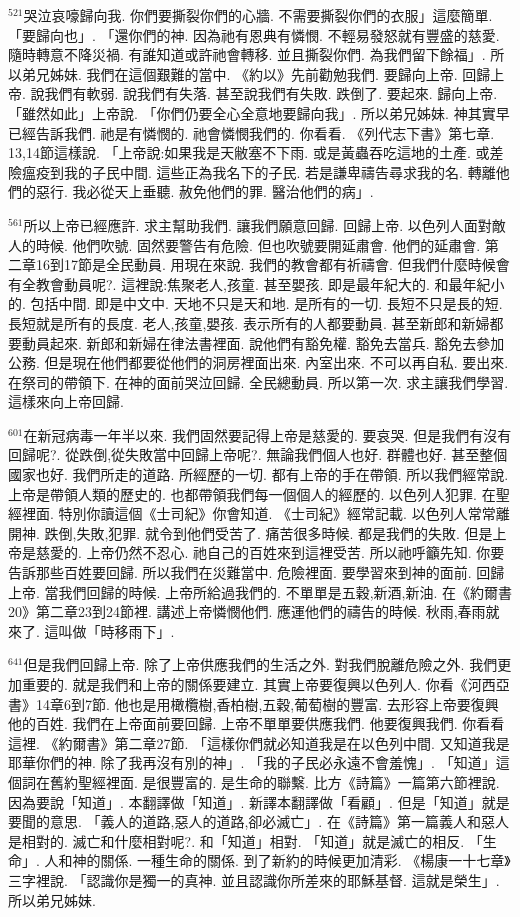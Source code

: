 \documentclass{book}
\begin{document}
$^{521}$哭泣哀嚎歸向我.
你們要撕裂你們的心牆.
不需要撕裂你們的衣服」這麼簡單.
「要歸向也」.
「還你們的神.
因為祂有恩典有憐憫.
不輕易發怒就有豐盛的慈愛.
隨時轉意不降災禍.
有誰知道或許祂會轉移.
並且撕裂你們.
為我們留下餘福」.
所以弟兄姊妹.
我們在這個艱難的當中.
《約以》先前勸勉我們.
要歸向上帝.
回歸上帝.
說我們有軟弱.
說我們有失落.
甚至說我們有失敗.
跌倒了.
要起來.
歸向上帝.
「雖然如此」上帝說.
「你們仍要全心全意地要歸向我」.
所以弟兄姊妹.
神其實早已經告訴我們.
祂是有憐憫的.
祂會憐憫我們的.
你看看.
《列代志下書》第七章.
13,14節這樣說.
「上帝說:如果我是天敝塞不下雨.
或是黃蟲吞吃這地的土產.
或差險瘟疫到我的子民中間.
這些正為我名下的子民.
若是謙卑禱告尋求我的名.
轉離他們的惡行.
我必從天上垂聽.
赦免他們的罪.
醫治他們的病」.

$^{561}$所以上帝已經應許.
求主幫助我們.
讓我們願意回歸.
回歸上帝.
以色列人面對敵人的時候.
他們吹號.
固然要警告有危險.
但也吹號要開延肅會.
他們的延肅會.
第二章16到17節是全民動員.
用現在來說.
我們的教會都有祈禱會.
但我們什麼時候會有全教會動員呢?.
這裡說:焦聚老人,孩童.
甚至嬰孩.
即是最年紀大的.
和最年紀小的.
包括中間.
即是中文中.
天地不只是天和地.
是所有的一切.
長短不只是長的短.
長短就是所有的長度.
老人,孩童,嬰孩.
表示所有的人都要動員.
甚至新郎和新婦都要動員起來.
新郎和新婦在律法書裡面.
說他們有豁免權.
豁免去當兵.
豁免去參加公務.
但是現在他們都要從他們的洞房裡面出來.
內室出來.
不可以再自私.
要出來.
在祭司的帶領下.
在神的面前哭泣回歸.
全民總動員.
所以第一次.
求主讓我們學習.
這樣來向上帝回歸.

$^{601}$在新冠病毒一年半以來.
我們固然要記得上帝是慈愛的.
要哀哭.
但是我們有沒有回歸呢?.
從跌倒,從失敗當中回歸上帝呢?.
無論我們個人也好.
群體也好.
甚至整個國家也好.
我們所走的道路.
所經歷的一切.
都有上帝的手在帶領.
所以我們經常說.
上帝是帶領人類的歷史的.
也都帶領我們每一個個人的經歷的.
以色列人犯罪.
在聖經裡面.
特別你讀這個《士司紀》你會知道.
《士司紀》經常記載.
以色列人常常離開神.
跌倒,失敗,犯罪.
就令到他們受苦了.
痛苦很多時候.
都是我們的失敗.
但是上帝是慈愛的.
上帝仍然不忍心.
祂自己的百姓來到這裡受苦.
所以祂呼籲先知.
你要告訴那些百姓要回歸.
所以我們在災難當中.
危險裡面.
要學習來到神的面前.
回歸上帝.
當我們回歸的時候.
上帝所給過我們的.
不單單是五穀,新酒,新油.
在《約爾書20》第二章23到24節裡.
講述上帝憐憫他們.
應運他們的禱告的時候.
秋雨,春雨就來了.
這叫做「時移雨下」.

$^{641}$但是我們回歸上帝.
除了上帝供應我們的生活之外.
對我們脫離危險之外.
我們更加重要的.
就是我們和上帝的關係要建立.
其實上帝要復興以色列人.
你看《河西亞書》14章6到7節.
他也是用橄欖樹,香柏樹,五穀,葡萄樹的豐富.
去形容上帝要復興他的百姓.
我們在上帝面前要回歸.
上帝不單單要供應我們.
他要復興我們.
你看看這裡.
《約爾書》第二章27節.
「這樣你們就必知道我是在以色列中間.
又知道我是耶華你們的神.
除了我再沒有別的神」.
「我的子民必永遠不會羞愧」.
「知道」這個詞在舊約聖經裡面.
是很豐富的.
是生命的聯繫.
比方《詩篇》一篇第六節裡說.
因為要說「知道」.
本翻譯做「知道」.
新譯本翻譯做「看顧」.
但是「知道」就是要聞的意思.
「義人的道路,惡人的道路,卻必滅亡」.
在《詩篇》第一篇義人和惡人是相對的.
滅亡和什麼相對呢?.
和「知道」相對.
「知道」就是滅亡的相反.
「生命」.
人和神的關係.
一種生命的關係.
到了新約的時候更加清彩.
《楊康一十七章》三字裡說.
「認識你是獨一的真神.
並且認識你所差來的耶穌基督.
這就是榮生」.
所以弟兄姊妹.
\end{document}
